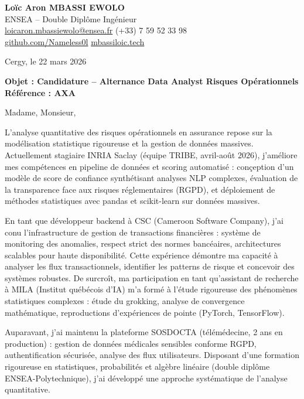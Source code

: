 \documentclass[a4paper,11pt]{article}
\begin{document}
\noindent
\textbf{Lo\"ic Aron MBASSI EWOLO} \\
ENSEA -- Double Dipl\^ome Ing\'enieur \\
\href{mailto:loicaron.mbassiewolo@ensea.fr}{loicaron.mbassiewolo@ensea.fr} \quad (+33) 7 59 52 33 98 \\
\href{https://github.com/Nameless0l}{github.com/Nameless0l} \quad \href{https://mbassiloic.tech}{mbassiloic.tech}

\vspace{1em}
\noindent Cergy, le 22 mars 2026

\vspace{1em}
\noindent
\textbf{Objet : Candidature -- Alternance Data Analyst Risques Op\'erationnels} \\
\textbf{R\'ef\'erence : AXA}

\vspace{1.5em}
\noindent Madame, Monsieur,

L'analyse quantitative des risques op\'erationnels en assurance repose sur la mod\'elisation statistique rigoureuse et la gestion de donn\'ees massives. Actuellement stagiaire INRIA Saclay (\'equipe TRIBE, avril-ao\^ut 2026), j'am\'eliore mes comp\'etences en pipeline de donn\'ees et scoring automatis\'e : con\c{c}eption d'un mod\`ele de score de confiance synth\'etisant analyses NLP complexes, \'evaluation de la transparence face aux risques r\'eglementaires (RGPD), et d\'eploiement de m\'ethodes statistiques avec pandas et scikit-learn sur donn\'ees massives.

\vspace{0.8em}

En tant que d\'eveloppeur backend \`a CSC (Cameroon Software Company), j'ai conu l'infrastructure de gestion de transactions financi\`eres : syst\`eme de monitoring des anomalies, respect strict des normes banc\'eaires, architectures scalables pour haute disponibilit\'e. Cette exp\'erience d\'emontre ma capacit\'e \`a analyser les flux transactionnels, identifier les patterns de risque et concevoir des syst\`emes robustes. De surcroît, ma participation en tant qu'assistant de recherche \`a MILA (Institut qu\'eb\'ecois d'IA) m'a form\'e \`a l'\'etude rigoureuse des ph\'enom\`enes statistiques complexes : \'etude du grokking, analyse de convergence math\'ematique, reproductions d'exp\'eriences de pointe (PyTorch, TensorFlow).

\vspace{0.8em}

Auparavant, j'ai maintenu la plateforme SOSDOCTA (t\'el\'em\'edecine, 2 ans en production) : gestion de donn\'ees m\'edicales sensibles conforme RGPD, authentification s\'ecuris\'ee, analyse des flux utilisateurs. Disposant d'une formation rigoureuse en statistiques, probabilit\'es et alg\`ebre lin\'eaire (double dipl\^ome ENSEA-Polytechnique), j'ai d\'evelopp\'e une approche syst\'ematique de l'analyse quantitative.
\end{document}
